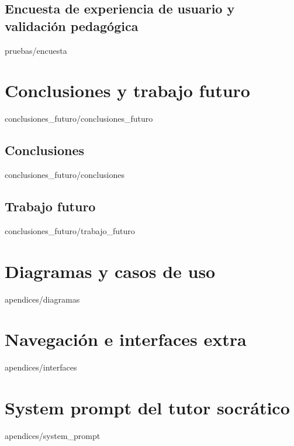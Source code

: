 \documentclass[epsbased,copyright,final,printable,covers,extendedindex,firstnumbered,tfg,gnuplot,lof,lot,loc]{tfgtfmthesisuam}
\begin{document}
  \section{Encuesta de experiencia de usuario y validación pedagógica\label{SEC:PR_ENCUESTA}}{pruebas/encuesta}

\chapter{Conclusiones y trabajo futuro\label{CAP:CONCLUSIONES_FUTURO}}{conclusiones_futuro/conclusiones_futuro}
  \section{Conclusiones\label{SEC:CF_CONCLUSIONES}}{conclusiones_futuro/conclusiones}
  \section{Trabajo futuro\label{SEC:CF_FUTURO}}{conclusiones_futuro/trabajo_futuro}

\appendix

\chapter{Diagramas y casos de uso\label{CAP:AP_DIAGRAMAS}}{apendices/diagramas}
\chapter{Navegación e interfaces extra\label{CAP:AP_INTERFACES}}{apendices/interfaces}
\chapter{System prompt del tutor socrático\label{CAP:AP_PROMPT}}{apendices/system_prompt}
\end{document}
